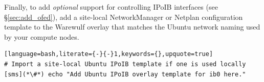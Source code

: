 \noindent Finally, to add {\em optional} support for controlling IPoIB
interfaces (see \S\ref{sec:add_ofed}), add a site-local NetworkManager or
Netplan configuration template to the Warewulf overlay that matches the Ubuntu
network naming used by your compute nodes.

\begin{lstlisting}[language=bash,literate={-}{-}1,keywords={},upquote=true]
# Import a site-local Ubuntu IPoIB template if one is used locally
[sms](*\#*) echo "Add Ubuntu IPoIB overlay template for ib0 here."
\end{lstlisting}
